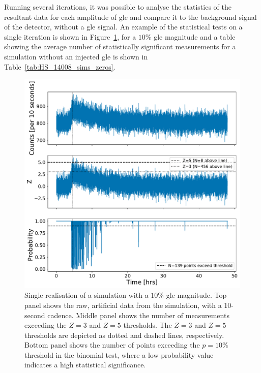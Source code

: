 Running several iterations, it was possible to analyse the statistics of the resultant data for each amplitude of \gls{gle} and compare it to the background signal of the detector, without a \gls{gle} signal. An example of the statistical tests on a single iteration is shown in Figure~\ref{fig:simulated_data_stats}, for a $10 \%$ \gls{gle} magnitude and a table showing the average number of statistically significant measurements for a simulation without an injected \gls{gle} is shown in Table~\ref{tab:HS_14008_sims_zeros}.


\begin{figure}[ht!]
	\centering
	\includegraphics[width=0.9\columnwidth]{simulated_data_stats.pdf}
	\caption{Single realisation of a simulation with a $10\%$ \gls{gle} magnitude. Top panel shows the raw, artificial data from the simulation, with a 10-second cadence. Middle panel shows the number of measurements exceeding the $Z=3$ and $Z=5$ thresholds. The $Z=3$ and $Z=5$ thresholds are depicted as dotted and dashed lines, respectively. Bottom panel shows the number of points exceeding the $p = 10 \%$ threshold in the binomial test, where a low probability value indicates a high statistical significance.}
	\label{fig:simulated_data_stats}
\end{figure}


